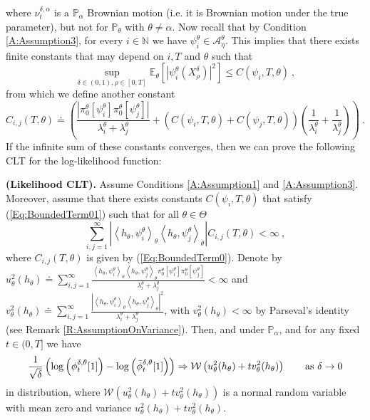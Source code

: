 \documentclass{article}
\begin{document}
where $\nu_t^{\delta,\alpha}$ is a $\mathbb P_\alpha$ Brownian motion (i.e. it is Brownian motion under the true parameter), but not for $\mathbb P_\theta$ with $\theta\neq \alpha$. Now recall that by Condition \ref{A:Assumption3}, for every $i\in\mathbb{N}$ we have $\psi_i^\theta\in\mathcal{A}_{\eta}^{\theta}$. This implies that there exists finite constants that may depend on $i, T$ and $\theta$ such that
\begin{equation}
\sup_{\delta\in(0,1),\rho\in[0,T]}\mathbb E_\theta\left[|\psi_i^\theta(X_\rho^\delta)|^2\right]\leq C(\psi_{i},T,\theta)\ ,
\label{Eq:BoundedTerm01}
\end{equation}
from which we define another constant
\begin{equation}
C_{i,j}(T,\theta)\doteq\left(\frac{\left|\pi^{\theta}_{0}[\psi_{i}^{\theta}]\pi^{\theta}_{0}[\psi_{j}^{\theta}]\right|}{\lambda_i^{\theta}+\lambda_j^{\theta}}+
  \left(C(\psi_{i},T,\theta)+C(\psi_{j},T,\theta)\right)\left(\frac{1}{\lambda_i^{\theta}}+\frac{1}{\lambda_j^{\theta}}\right)\right)\ .\label{Eq:BoundedTerm0}
\end{equation}
If the infinite sum of these constants converges, then we can prove the following CLT for the log-likelihood function:



\begin{theorem}  \label{thm:CLT} \textbf{(Likelihood CLT).} Assume Conditions \ref{A:Assumption1} and \ref{A:Assumption3}. Moreover, assume that there exists constants $C(\psi_{i},T,\theta)$ that satisfy (\ref{Eq:BoundedTerm01}) such that for all $\theta\in\Theta$
\[
\sum_{i,j=1}^{\infty}|\left<h_{\theta},\psi_i^{\theta}\right>_{\theta}\left<h_{\theta},\psi_j^{\theta}\right>_{\theta}|C_{i,j}(T,\theta)<\infty\ ,
\]
where $C_{i,j}(T,\theta)$ is given by (\ref{Eq:BoundedTerm0}). Denote by
$u^{2}_{\theta}(h_{\theta})\doteq \sum_{i,j=1}^{\infty}\frac{\left<h_{\theta},\psi_i^{\theta}\right>_{\theta}\left<h_{\theta},\psi_j^{\theta}\right>_{\theta}\pi_0^{\theta}[\psi_i^{\theta}]\pi_0^{\theta}[\psi_j^{\theta}]}{\lambda_i^{\theta} +\lambda_j^{\theta}}<\infty $
and
$v^{2}_{\theta}(h_{\theta})\doteq \sum_{i,j=1}^{\infty}\frac{\left|\left<h_{\theta},\psi_i^{\theta}\right>_{\theta}\left<h_{\theta},\psi_j^{\theta}\right>_{\theta}\right|^{2}}{\lambda_i^{\theta}+\lambda_j^{\theta}}$, with $v_\theta^2(h_\theta)<\infty$ by Parseval's identity (see Remark \ref{R:AssumptionOnVariance}). Then, and under $\mathbb P_{\alpha}$, and for any fixed $t\in(0,T]$ we have
\[\frac{1}{\sqrt\delta}\left(\log\left( \phi^{\delta,\theta}_{t}[1]\right)-\log\left( \bar\phi^{\delta,\theta}_{t}[1]\right)\right)\Rightarrow\mathcal W\left(u^{2}_{\theta}(h_{\theta})+t v^{2}_{\theta}(h_{\theta})\right)\qquad\hbox{as }\delta\rightarrow 0 \]
in distribution, where $\mathcal{W}\left(u^{2}_{\theta}(h_{\theta})+t v^{2}_{\theta}(h_{\theta})\right)$ is a normal random variable with mean zero and variance $u^{2}_{\theta}(h_{\theta})+t v^{2}_{\theta}(h_{\theta})$.
\end{theorem}
\end{document}
